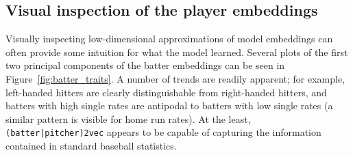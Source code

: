 \documentclass{article}
\begin{document}
\subsection{Visual inspection of the player embeddings}

Visually inspecting low-dimensional approximations of model embeddings can often provide some intuition for what the model learned. Several plots of the first two principal components of the batter embeddings can be seen in Figure~\ref{fig:batter_traits}. A number of trends are readily apparent; for example, left-handed hitters are clearly distinguishable from right-handed hitters, and batters with high single rates are antipodal to batters with low single rates (a similar pattern is visible for home run rates). At the least, \texttt{(batter|pitcher)2vec} appears to be capable of capturing the information contained in standard baseball statistics.
\end{document}
